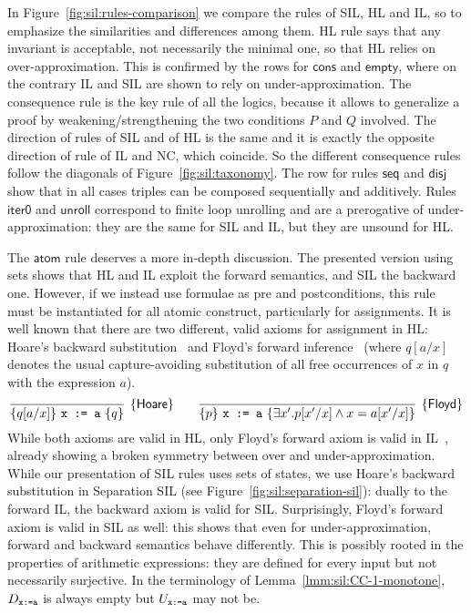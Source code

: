 In Figure~\ref{fig:sil:rules-comparison} we compare the rules of SIL, HL and IL, so to emphasize the similarities and differences among them.
HL rule  says that any invariant is acceptable, not necessarily the minimal one, so that HL relies on over-approximation.
This is confirmed by the rows for $\mathsf{cons}$ and $\mathsf{empty}$, where on the contrary IL and SIL are shown to rely on under-approximation.
The consequence rule is the key rule of all the logics, because it allows to generalize a proof by weakening/strengthening the two conditions $P$ and $Q$ involved. The direction of rules  of SIL and  of HL is the same and it is exactly the opposite direction of rule  of IL and NC, which coincide. So the different consequence rules follow the diagonals of Figure~\ref{fig:sil:taxonomy}.
The row for rules $\mathsf{seq}$ and $\mathsf{disj}$ show that in all cases triples can be composed sequentially and additively.
Rules $\mathsf{iter0}$ and $\mathsf{unroll}$ correspond to finite loop unrolling and are a prerogative of under-approximation: they are the same for SIL and IL, but they are unsound for HL.

The $\mathsf{atom}$ rule deserves a more in-depth discussion. The presented version using sets shows that HL and IL exploit the forward semantics, and SIL the backward one. However, if we instead use formulae as pre and postconditions, this rule must be instantiated for all atomic construct, particularly for assignments.
It is well known that there are two different, valid axioms for assignment in HL: Hoare's backward substitution~\cite{Hoare69} and Floyd's forward inference~\cite{Floyd67} (where $q[a / x]$ denotes the usual capture-avoiding substitution of all free occurrences of $x$ in $q$ with the expression $a$).
\[
\infer[\hlrule{Hoare}]
{\hltriple{q[a / x]}{\code{x := a}}{q}}
{}
\qquad
\infer[\hlrule{Floyd}]
{\hltriple{p}{\code{x := a}}{\exists x'. p[x'/x]\wedge x=a[x'/x]}}
{}
\]
While both axioms are valid in HL, only Floyd's forward axiom is valid in IL~\cite[\S 4]{OHearn20}, already showing a broken symmetry between over and under-approximation.
While our presentation of SIL rules uses sets of states, we use Hoare's backward substitution in Separation SIL (see Figure~\ref{fig:sil:separation-sil}): dually to the forward IL, the backward axiom is valid for SIL. Surprisingly, Floyd's forward axiom is valid in SIL as well: this shows that even for under-approximation, forward and backward semantics behave differently. This is possibly rooted in the properties of arithmetic expressions: they are defined for every input but not necessarily surjective. In the terminology of Lemma~\ref{lmm:sil:CC-1-monotone}, $D_{\texttt{x:=a}}$ is always empty but $U_{\texttt{x:=a}}$ may not be.

